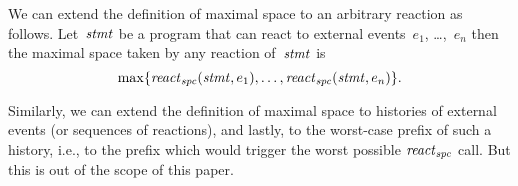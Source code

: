 We can extend the definition of maximal space to an arbitrary reaction as
follows.  Let~$\mathit{stmt}$ be a program that can react to external events~$e_1$,
\dots,~$e_n$ then the maximal space taken by any reaction of~$\mathit{stmt}$ is
\[
  \max\{\operatorname{\mathit{react}}\nolimits_\mathit{spc}(\mathit{stmt},e_1),\dots,\operatorname{\mathit{react}}\nolimits_\mathit{spc}(\mathit{stmt},e_n)\}.
\]

Similarly, we can extend the definition of maximal space to histories of
external events (or sequences of reactions), and lastly, to the worst-case
prefix of such a history, i.e., to the prefix which would trigger the worst
possible $\operatorname{\mathit{react}}\nolimits_\mathit{spc}$ call.  But this is out of the scope of this paper.




